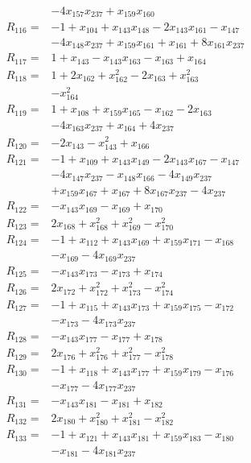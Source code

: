 \begin{align*}
&-4x_{157}x_{237} +x_{159}x_{160}\\[3pt]
R_{116}={}&-1 +x_{104} +x_{143}x_{148} -2x_{143}x_{161} -x_{147}\\
&-4x_{148}x_{237} +x_{159}x_{161} +x_{161} +8x_{161}x_{237}\\[3pt]
R_{117}={}&1 +x_{143} -x_{143}x_{163} -x_{163} +x_{164}\\[3pt]
R_{118}={}&1 +2x_{162} +x_{162}^{2} -2x_{163} +x_{163}^{2}\\
&-x_{164}^{2}\\[3pt]
R_{119}={}&1 +x_{108} +x_{159}x_{165} -x_{162} -2x_{163}\\
&-4x_{163}x_{237} +x_{164} +4x_{237}\\[3pt]
R_{120}={}&-2x_{143} -x_{143}^{2} +x_{166}\\[3pt]
R_{121}={}&-1 +x_{109} +x_{143}x_{149} -2x_{143}x_{167} -x_{147}\\
&-4x_{147}x_{237} -x_{148}x_{166} -4x_{149}x_{237}\\
&+x_{159}x_{167} +x_{167} +8x_{167}x_{237} -4x_{237}\\[3pt]
R_{122}={}&-x_{143}x_{169} -x_{169} +x_{170}\\[3pt]
R_{123}={}&2x_{168} +x_{168}^{2} +x_{169}^{2} -x_{170}^{2}\\[3pt]
R_{124}={}&-1 +x_{112} +x_{143}x_{169} +x_{159}x_{171} -x_{168}\\
&-x_{169} -4x_{169}x_{237}\\[3pt]
R_{125}={}&-x_{143}x_{173} -x_{173} +x_{174}\\[3pt]
R_{126}={}&2x_{172} +x_{172}^{2} +x_{173}^{2} -x_{174}^{2}\\[3pt]
R_{127}={}&-1 +x_{115} +x_{143}x_{173} +x_{159}x_{175} -x_{172}\\
&-x_{173} -4x_{173}x_{237}\\[3pt]
R_{128}={}&-x_{143}x_{177} -x_{177} +x_{178}\\[3pt]
R_{129}={}&2x_{176} +x_{176}^{2} +x_{177}^{2} -x_{178}^{2}\\[3pt]
R_{130}={}&-1 +x_{118} +x_{143}x_{177} +x_{159}x_{179} -x_{176}\\
&-x_{177} -4x_{177}x_{237}\\[3pt]
R_{131}={}&-x_{143}x_{181} -x_{181} +x_{182}\\[3pt]
R_{132}={}&2x_{180} +x_{180}^{2} +x_{181}^{2} -x_{182}^{2}\\[3pt]
R_{133}={}&-1 +x_{121} +x_{143}x_{181} +x_{159}x_{183} -x_{180}\\
&-x_{181} -4x_{181}x_{237}\\[3pt]

\end{align*}
